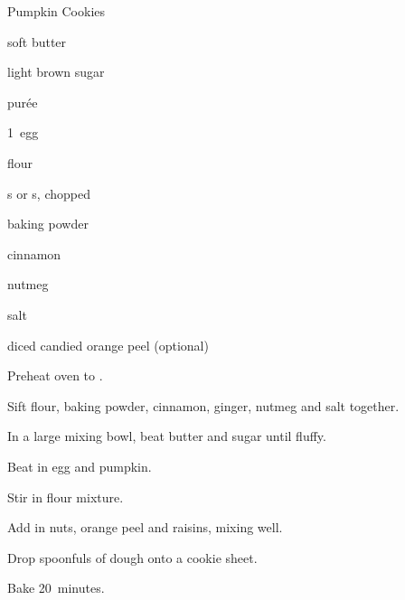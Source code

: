\begin{recipe}{Pumpkin Cookies}{}{}

\begin{ingredients}
\item \C{\quarter} soft butter
\item \C{\half} light brown sugar
\item \C{\half}  pur\'ee
\item 1~egg
\item {} flour
\item \C{\half} 
\item \C{\half}  s or s, chopped 
\item {} baking powder
\item {} cinnamon
\item \tp{\quarter} 
\item \tp{\quarter} nutmeg
\item \tp{\quarter} salt
\item \C{\quarter} diced candied orange peel (optional)
\end{ingredients}

\begin{directions}
\item Preheat oven to . 
\item Sift flour, baking powder, cinnamon, ginger, nutmeg and salt together.
\item In a large mixing bowl, beat butter and sugar until fluffy. 
\item Beat in egg and pumpkin.
\item Stir in flour mixture. 
\item Add in nuts, orange peel and raisins, mixing well. 
\item Drop spoonfuls of dough onto a cookie sheet. 
\item Bake 20~minutes.
\end{directions}
\end{recipe}
